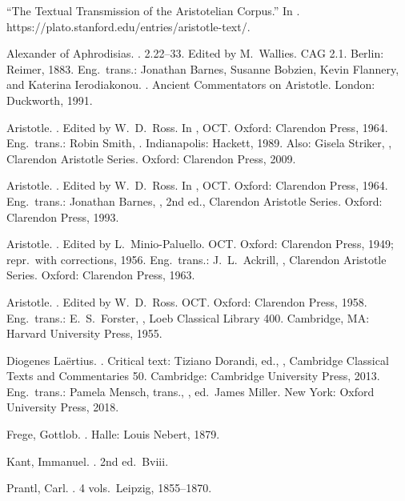 \documentclass[12pt, a4paper]{article}
\begin{document}
\begin{references}
 ``The Textual Transmission of the Aristotelian Corpus.'' In . https://plato.stanford.edu/entries/aristotle-text/.

 Alexander of Aphrodisias. . 2.22--33. Edited by M.\ Wallies. CAG 2.1. Berlin: Reimer, 1883. Eng.\ trans.: Jonathan Barnes, Susanne Bobzien, Kevin Flannery, and Katerina Ierodiakonou. . Ancient Commentators on Aristotle. London: Duckworth, 1991.

 Aristotle. . Edited by W.\ D.\ Ross. In , OCT. Oxford: Clarendon Press, 1964. Eng.\ trans.: Robin Smith, . Indianapolis: Hackett, 1989. Also: Gisela Striker, , Clarendon Aristotle Series. Oxford: Clarendon Press, 2009.

 Aristotle. . Edited by W.\ D.\ Ross. In , OCT. Oxford: Clarendon Press, 1964. Eng.\ trans.: Jonathan Barnes, , 2nd ed., Clarendon Aristotle Series. Oxford: Clarendon Press, 1993.

 Aristotle. . Edited by L.\ Minio-Paluello. OCT. Oxford: Clarendon Press, 1949; repr.\ with corrections, 1956. Eng.\ trans.: J.\ L.\ Ackrill, , Clarendon Aristotle Series. Oxford: Clarendon Press, 1963.

 Aristotle. . Edited by W.\ D.\ Ross. OCT. Oxford: Clarendon Press, 1958. Eng.\ trans.: E.\ S.\ Forster, , Loeb Classical Library 400. Cambridge, MA: Harvard University Press, 1955.

 Diogenes La\"ertius. . Critical text: Tiziano Dorandi, ed., , Cambridge Classical Texts and Commentaries 50. Cambridge: Cambridge University Press, 2013. Eng.\ trans.: Pamela Mensch, trans., , ed.\ James Miller. New York: Oxford University Press, 2018.

 Frege, Gottlob. . Halle: Louis Nebert, 1879.

 Kant, Immanuel. . 2nd ed.\ Bviii.

 Prantl, Carl. . 4 vols.\ Leipzig, 1855--1870.

\end{references}
\end{document}

